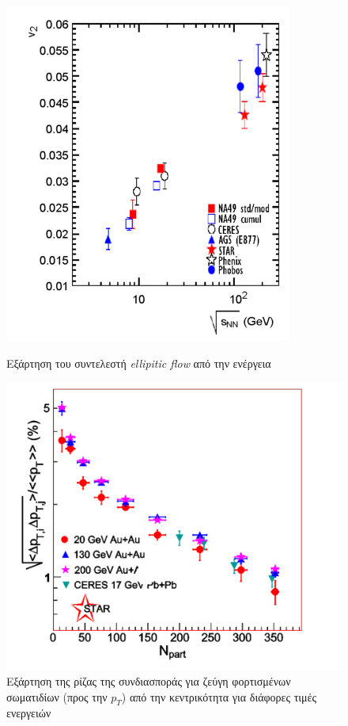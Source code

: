 	
	\begin{figure}[h!]
	    \centering
	    \begin{minipage}{.5\textwidth}
	        \centering
	        \includegraphics[scale=0.7]{STAR_Results/energy_dependence_of_v2}
	        \caption{Εξάρτηση του συντελεστή \textit{ellipitic flow} από την ενέργεια}
	        \label{fig4.6}
	    \end{minipage}%
	    \begin{minipage}{0.5\textwidth}
	        \centering
	        \includegraphics[scale=0.7]{STAR_Results/momentum_covariance_4_charged_particle_pairs}
	        \caption{Εξάρτηση της ρίζας της συνδιασποράς για ζεύγη φορτισμένων σωματιδίων  (προς την $p_T$) από την κεντρικότητα για διάφορες τιμές ενεργειών}
	        \label{fig4.7}
	    \end{minipage}
	\end{figure}
	
